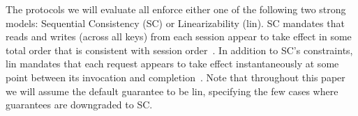 
The protocols we will evaluate all enforce either one of the following two strong models: 
Sequential Consistency (SC) or Linearizability (lin).
SC mandates that reads and writes (across all keys) from each session appear to take effect in some total order that is consistent with session order~\cite{Lamport:1979}.  
In addition to SC's constraints, lin mandates that each request appears to take effect instantaneously at some point between its invocation and completion~\cite{Herlihy:1990}. 
Note that throughout this paper we will assume the default guarantee to be lin, specifying the few cases where guarantees are downgraded to SC.




\begin{comment}
\subsection{Failure models}
In this work, we compare protocols that can tolerate crash-stop or network failures.
In this model, processes may fail by crashing and their operation is non-Byzantine. Additionally, network failures can manifest as either (1) message reordering, duplication and loss, or (2) link failures that may lead to network partitions.
Within this model, evaluated protocols make different assumptions about synchrony. The stricter restrictions imposed by any protocol is partial synchrony with loosely synchronized clocks (\eg Hermes~\cite{A:2020}). 
\end{comment}

